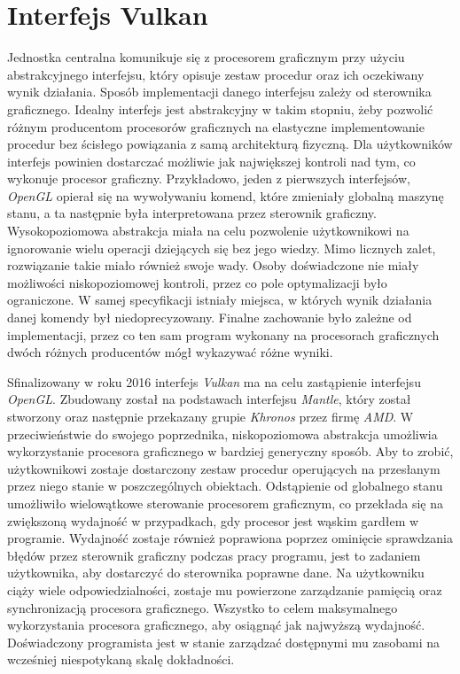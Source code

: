 \section{Interfejs Vulkan}
\label{sec:vulkan_iface}

Jednostka centralna komunikuje się z procesorem graficznym przy użyciu abstrakcyjnego interfejsu, który opisuje zestaw procedur oraz ich oczekiwany wynik działania.
Sposób implementacji danego interfejsu zależy od sterownika graficznego.
Idealny interfejs jest abstrakcyjny w takim stopniu, żeby pozwolić różnym producentom procesorów graficznych na elastyczne implementowanie procedur bez ścisłego powiązania z samą architekturą fizyczną.
Dla użytkowników interfejs powinien dostarczać możliwie jak największej kontroli nad tym, co wykonuje procesor graficzny. 
Przykładowo, jeden z pierwszych interfejsów, \textit{OpenGL} opierał się na wywoływaniu komend, które zmieniały globalną maszynę stanu, a ta następnie była interpretowana przez sterownik graficzny.
Wysokopoziomowa abstrakcja miała na celu pozwolenie użytkownikowi na ignorowanie wielu operacji dziejących się bez jego wiedzy.
Mimo licznych zalet, rozwiązanie takie miało również swoje wady.
Osoby doświadczone nie miały możliwości niskopoziomowej kontroli, przez co pole optymalizacji było ograniczone.
W samej specyfikacji istniały miejsca, w których wynik działania danej komendy był niedoprecyzowany.
Finalne zachowanie było zależne od implementacji, przez co ten sam program wykonany na procesorach graficznych dwóch różnych producentów mógł wykazywać różne wyniki.

Sfinalizowany w roku 2016 interfejs \textit{Vulkan} \cite{VulkanSpec} ma na celu zastąpienie interfejsu \textit{OpenGL}.
Zbudowany został na podstawach interfejsu \textit{Mantle}, który został stworzony oraz następnie przekazany grupie \textit{Khronos} przez firmę \textit{AMD}.
W przeciwieństwie do swojego poprzednika, niskopoziomowa abstrakcja umożliwia wykorzystanie procesora graficznego w bardziej generyczny sposób.
Aby to zrobić, użytkownikowi zostaje dostarczony zestaw procedur operujących na przesłanym przez niego stanie w poszczególnych obiektach.
Odstąpienie od globalnego stanu umożliwiło wielowątkowe sterowanie procesorem graficznym, co przekłada się na zwiększoną wydajność w przypadkach, gdy procesor jest wąskim gardłem w programie.
Wydajność zostaje również poprawiona poprzez ominięcie sprawdzania błędów przez sterownik graficzny podczas pracy programu, jest to zadaniem użytkownika, aby dostarczyć do sterownika poprawne dane.
Na użytkowniku ciąży wiele odpowiedzialności, zostaje mu powierzone zarządzanie pamięcią oraz synchronizacją procesora graficznego.
Wszystko to celem maksymalnego wykorzystania procesora graficznego, aby osiągnąć jak najwyższą wydajność.
Doświadczony programista jest w stanie zarządzać dostępnymi mu zasobami na wcześniej niespotykaną skalę dokładności.


